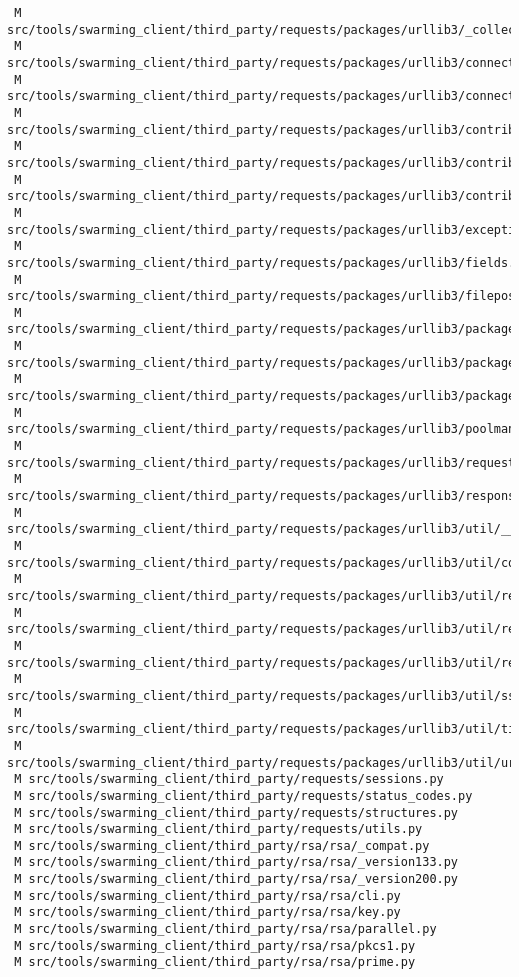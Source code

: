 \documentclass{article}
\begin{document}
\begin{verbatim}
 M src/tools/swarming_client/third_party/requests/packages/urllib3/_collections.py
 M src/tools/swarming_client/third_party/requests/packages/urllib3/connection.py
 M src/tools/swarming_client/third_party/requests/packages/urllib3/connectionpool.py
 M src/tools/swarming_client/third_party/requests/packages/urllib3/contrib/appengine.py
 M src/tools/swarming_client/third_party/requests/packages/urllib3/contrib/ntlmpool.py
 M src/tools/swarming_client/third_party/requests/packages/urllib3/contrib/pyopenssl.py
 M src/tools/swarming_client/third_party/requests/packages/urllib3/exceptions.py
 M src/tools/swarming_client/third_party/requests/packages/urllib3/fields.py
 M src/tools/swarming_client/third_party/requests/packages/urllib3/filepost.py
 M src/tools/swarming_client/third_party/requests/packages/urllib3/packages/__init__.py
 M src/tools/swarming_client/third_party/requests/packages/urllib3/packages/ordered_dict.py
 M src/tools/swarming_client/third_party/requests/packages/urllib3/packages/six.py
 M src/tools/swarming_client/third_party/requests/packages/urllib3/poolmanager.py
 M src/tools/swarming_client/third_party/requests/packages/urllib3/request.py
 M src/tools/swarming_client/third_party/requests/packages/urllib3/response.py
 M src/tools/swarming_client/third_party/requests/packages/urllib3/util/__init__.py
 M src/tools/swarming_client/third_party/requests/packages/urllib3/util/connection.py
 M src/tools/swarming_client/third_party/requests/packages/urllib3/util/request.py
 M src/tools/swarming_client/third_party/requests/packages/urllib3/util/response.py
 M src/tools/swarming_client/third_party/requests/packages/urllib3/util/retry.py
 M src/tools/swarming_client/third_party/requests/packages/urllib3/util/ssl_.py
 M src/tools/swarming_client/third_party/requests/packages/urllib3/util/timeout.py
 M src/tools/swarming_client/third_party/requests/packages/urllib3/util/url.py
 M src/tools/swarming_client/third_party/requests/sessions.py
 M src/tools/swarming_client/third_party/requests/status_codes.py
 M src/tools/swarming_client/third_party/requests/structures.py
 M src/tools/swarming_client/third_party/requests/utils.py
 M src/tools/swarming_client/third_party/rsa/rsa/_compat.py
 M src/tools/swarming_client/third_party/rsa/rsa/_version133.py
 M src/tools/swarming_client/third_party/rsa/rsa/_version200.py
 M src/tools/swarming_client/third_party/rsa/rsa/cli.py
 M src/tools/swarming_client/third_party/rsa/rsa/key.py
 M src/tools/swarming_client/third_party/rsa/rsa/parallel.py
 M src/tools/swarming_client/third_party/rsa/rsa/pkcs1.py
 M src/tools/swarming_client/third_party/rsa/rsa/prime.py

\end{verbatim}
\end{document}
